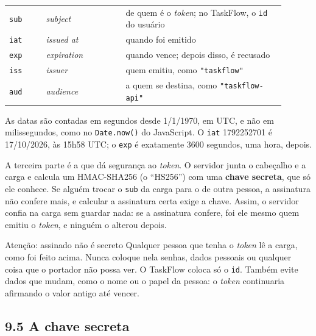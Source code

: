 \begin{center}
\begin{tabular}{@{}P{0.12\linewidth}P{0.26\linewidth}P{0.52\linewidth}@{}}
\toprule
{}
 &  &  \\
\midrule
\texttt{sub} & \textit{subject} & de quem é o \textit{token}; no TaskFlow, o \texttt{id} do usuário \\
 \texttt{iat} & \textit{issued at} & quando foi emitido \\
\texttt{exp} & \textit{expiration} & quando vence; depois disso, é recusado \\
 \texttt{iss} & \textit{issuer} & quem emitiu, como \texttt{"taskflow"} \\
\texttt{aud} & \textit{audience} & a quem se destina, como \texttt{"taskflow-api"} \\
\bottomrule
\end{tabular}
\end{center}

As datas são contadas em segundos desde 1/1/1970, em UTC, e não em milissegundos, como no \texttt{Date.now()} do JavaScript. O \texttt{iat} 1792252701 é 17/10/2026, às 15h58 UTC; o \texttt{exp} é exatamente 3600 segundos, uma hora, depois.

A terceira parte é a que dá segurança ao \textit{token}. O servidor junta o cabeçalho e a carga e calcula um HMAC-SHA256 (o ``HS256'') com uma \textbf{chave secreta}, que só ele conhece. Se alguém trocar o \texttt{sub} da carga para o de outra pessoa, a assinatura não confere mais, e calcular a assinatura certa exige a chave. Assim, o servidor confia na carga sem guardar nada: se a assinatura confere, foi ele mesmo quem emitiu o \textit{token}, e ninguém o alterou depois.

\begin{destaque}{Atenção: assinado não é secreto}
Qualquer pessoa que tenha o \textit{token} lê a carga, como foi feito acima. Nunca coloque nela senhas, dados pessoais ou qualquer coisa que o portador não possa ver. O TaskFlow coloca só o \texttt{id}. Também evite dados que mudam, como o nome ou o papel da pessoa: o \textit{token} continuaria afirmando o valor antigo até vencer.
\end{destaque}

\subsection{9.5 A chave secreta}

